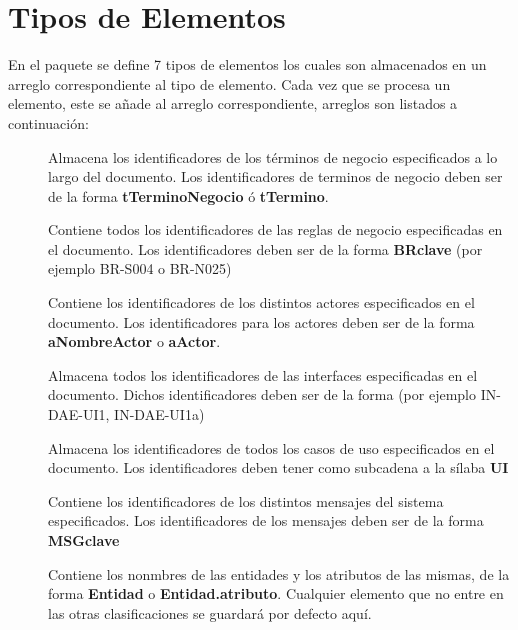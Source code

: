 \section{Tipos de Elementos}

    En el paquete se define 7 tipos de elementos los cuales son almacenados en un arreglo correspondiente al tipo de elemento. Cada vez que se procesa un elemento, este se añade al arreglo correspondiente, arreglos son listados a continuación:
    
    \begin{description}
        \item[] Almacena los identificadores de los términos de negocio especificados a lo largo del documento. Los identificadores de terminos de negocio deben ser de la forma {\bf tTerminoNegocio} ó {\bf tTermino}.
        
        \item[] Contiene todos los identificadores de las reglas de negocio especificadas en el documento. Los identificadores deben ser de la forma {\bf BRclave} (por ejemplo BR-S004 o BR-N025)
        
        \item[] Contiene los identificadores de los distintos actores especificados en el documento. Los identificadores para los actores deben ser de la forma {\bf aNombreActor} o {\bf aActor}.
        
        \item[] Almacena todos los identificadores de las interfaces especificadas en el documento. Dichos identificadores deben ser de la forma {\bf} (por ejemplo IN-DAE-UI1, IN-DAE-UI1a)
        
        \item[] Almacena los identificadores de todos los casos de uso especificados en el documento. Los identificadores deben tener como subcadena a la sílaba {\bf UI}
        
        \item[] Contiene los identificadores de los distintos mensajes del sistema especificados. Los identificadores de los mensajes deben ser de la forma {\bf MSGclave}
        
        \item[] Contiene los nonmbres de las entidades y los atributos de las mismas, de la forma {\bf Entidad} o {\bf Entidad.atributo}. Cualquier elemento que no entre en las otras clasificaciones se guardará por defecto aquí.
    \end{description}


